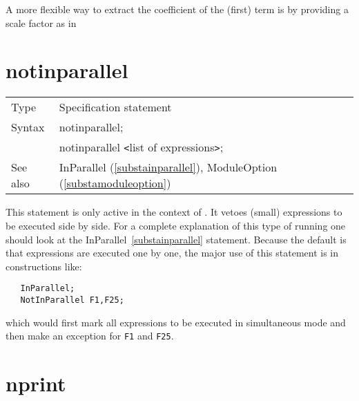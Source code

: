 

A more flexible way to extract the coefficient of the (first) term is by 
providing a scale factor as in

\vspace{10mm}


\section{notinparallel}
\label{substanotinparallel}

\noindent \begin{tabular}{ll}
Type & Specification statement\\
Syntax & notinparallel; \\
       & notinparallel {\tt<}list of expressions{\tt>};
\\ See also & InParallel (\ref{substainparallel}), 
     ModuleOption (\ref{substamoduleoption})
\end{tabular} \vspace{4mm}

\noindent This statement is only active in the context of 
\TFORM{}. It vetoes (small) expressions to be executed side by 
side. For a complete explanation of this type of running one should look at 
the InParallel~\ref{substainparallel} statement. Because the default is 
that expressions are executed one by one, the major use of this statement 
is in constructions like:
\begin{verbatim}
   InParallel;
   NotInParallel F1,F25;
\end{verbatim}
which would first mark all expressions to be executed in simultaneous mode 
and then make an exception for {\tt F1} and {\tt F25}.
\vspace{10mm}


\section{nprint}
\label{substanprint}


